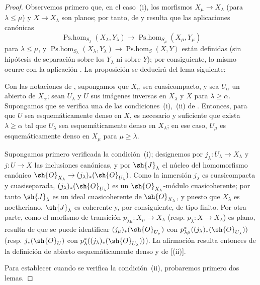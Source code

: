 \begin{proof}
Observemos primero que, en el caso~(i), los morfismos $X_\mu\to X_\lambda$ (para $\lambda\leq\mu$) y $X\to X_\lambda$ son planos; por tanto, de  y  resulta que las aplicaciones canónicas
\[
  \operatorname{Ps.hom}_{S_\lambda}(X_\lambda,Y_\lambda)\to\operatorname{Ps.hom}_{S_\mu}(X_\mu,Y_\mu)
\]
para $\lambda\leq\mu$, y $\operatorname{Ps.hom}_{S_\lambda}(X_\lambda,Y_\lambda)\to\operatorname{Ps.hom}_S(X,Y)$ están definidas (sin hipótesis de separación sobre los $Y_\lambda$ ni sobre $Y$); por consiguiente, lo mismo ocurre con la aplicación .
La proposición se deducirá del lema siguiente:

\begin{lemma}[20.3.8.2]
\label{IV.20.3.8.2}
Con las notaciones de , supongamos que $X_\alpha$ sea cuasicompacto, y sea $U_\alpha$ un abierto de $X_\alpha$; sean $U_\lambda$ y $U$ sus imágenes inversas en $X_\lambda$ y $X$ para $\lambda\geq\alpha$.
Supongamos que se verifica una de las condiciones~\textup{(i)},~\textup{(ii)} de .
Entonces, para que $U$ sea esquemáticamente denso en $X$, es necesario y suficiente que exista $\lambda\geq\alpha$ tal que $U_\lambda$ sea esquemáticamente denso en $X_\lambda$; en ese caso, $U_\mu$ es esquemáticamente denso en $X_\mu$ para $\mu\geq\lambda$.
\end{lemma}

Supongamos primero verificada la condición~(i); designemos por $j_\lambda:U_\lambda\to X_\lambda$ y $j:U\to X$ las inclusiones canónicas, y por $\sh{J}_\lambda$ el núcleo del homomorfismo canónico $\sh{O}_{X_\lambda}\to(j_\lambda)_*(\sh{O}_{U_\lambda})$.
Como la inmersión $j_\lambda$ es cuasicompacta y cuasiseparada, $(j_\lambda)_*(\sh{O}_{U_\lambda})$ es un $\sh{O}_{X_\lambda}$-módulo cuasicoherente; por tanto $\sh{J}_\lambda$ es un ideal cuasicoherente de $\sh{O}_{X_\lambda}$, y puesto que $X_\lambda$ es noetheriano, $\sh{J}_\lambda$ es coherente y, por consiguiente, de tipo finito.
Por otra parte, como el morfismo de transición $p_{\lambda\mu}:X_\mu\to X_\lambda$ (resp. $p_\lambda:X\to X_\lambda$) es plano, resulta de  que se puede identificar $(j_\mu)_*(\sh{O}_{U_\mu})$ con $p_{\lambda\mu}^*((j_\lambda)_*(\sh{O}_{U_\lambda}))$ (resp. $j_*(\sh{O}_U)$ con $p_\lambda^*((j_\lambda)_*(\sh{O}_{U_\lambda}))$).
La afirmación resulta entonces de la definición de abierto esquemáticamente denso y de [(ii)].

Para establecer  cuando se verifica la condición~(ii), probaremos primero dos lemas.


\end{proof}
